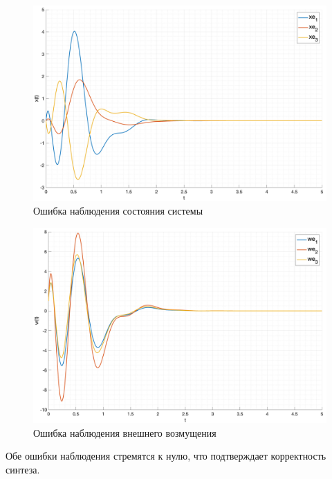 \begin{figure}[ht!]
    \centering
    \includegraphics[width=\textwidth]{media/plots/task3_z2_xerr_cmp.png}
    \caption{Ошибка наблюдения состояния системы}
    \label{fig:task3_z2_xerr_cmp}
\end{figure}
\begin{figure}[ht!]
    \centering
    \includegraphics[width=\textwidth]{media/plots/task3_z2_werr_cmp.png}
    \caption{Ошибка наблюдения внешнего возмущения}
    \label{fig:task3_z2_werr_cmp}
\end{figure}
Обе ошибки наблюдения стремятся к нулю, что подтверждает корректность синтеза. 

